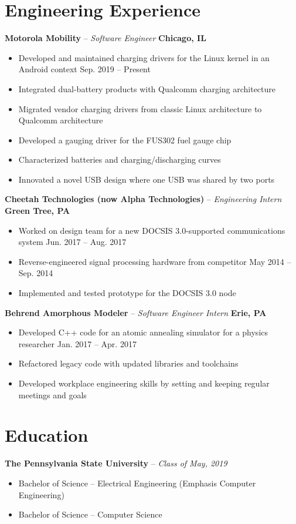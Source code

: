 \documentclass[letterpaper,10pt]{article}
\begin{document}
\section{Engineering Experience}
\textbf{Motorola Mobility} -- \textit{Software Engineer} \hfill \textbf{Chicago, IL}
{\setlength{\parskip}{0pt}\begin{itemize}
\item Developed and maintained charging drivers for the Linux kernel in an Android context \hfill Sep. 2019 -- Present
\item Integrated dual-battery products with Qualcomm charging architecture
\item Migrated vendor charging drivers from classic Linux architecture to Qualcomm architecture
\item Developed a gauging driver for the FUS302 fuel gauge chip
\item Characterized batteries and charging/discharging curves
\item Innovated a novel USB design where one USB was shared by two ports
\end{itemize}}
\textbf{Cheetah Technologies (now Alpha Technologies)} -- \textit{Engineering Intern} \hfill \textbf{Green Tree, PA}
{\setlength{\parskip}{0pt}\begin{itemize}
\item Worked on design team for a new DOCSIS 3.0-supported communications system \hfill Jun. 2017 -- Aug. 2017
\item Reverse-engineered signal processing hardware from competitor \hfill May 2014 -- Sep. 2014
\item Implemented and tested prototype for the DOCSIS 3.0 node
\end{itemize}}
\textbf{Behrend Amorphous Modeler} -- \textit{Software Engineer Intern} \hfill \textbf{Erie, PA}
{\setlength{\parskip}{0pt}\begin{itemize}
\item Developed C++ code for an atomic annealing simulator for a physics researcher \hfill Jan. 2017 -- Apr. 2017
\item Refactored legacy code with updated libraries and toolchains
\item Developed workplace engineering skills by setting and keeping regular meetings and goals
\end{itemize}}

\section{Education}
\textbf{The Pennsylvania State University} -- \textit{Class of May, 2019}
{\setlength{\parskip}{0pt}\begin{itemize}
\item Bachelor of Science -- Electrical Engineering (Emphasis Computer Engineering)
\item Bachelor of Science -- Computer Science
\end{itemize}}
\end{document}
